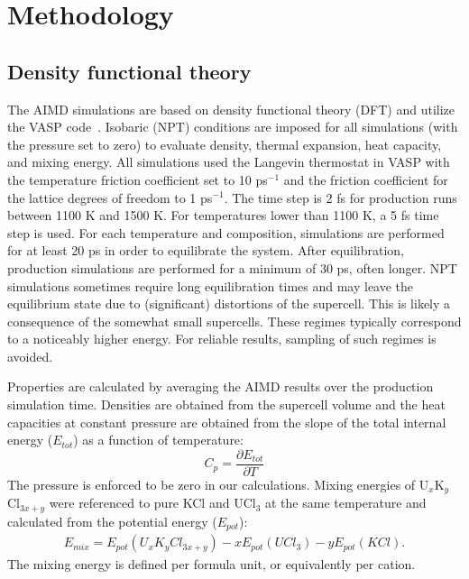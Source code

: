 \documentclass[preprint,3p,10pt,number,sort&compress]{elsarticle}
\begin{document}
\section{Methodology}
\label{sec:method}
\subsection{Density functional theory}
The AIMD simulations are based on density functional theory (DFT) and utilize the VASP code~\cite{Kresse1996}.
Isobaric (NPT) conditions are imposed for all simulations (with the pressure set to zero) to evaluate density, thermal expansion, heat capacity, and mixing energy. All simulations used the Langevin thermostat in VASP with the temperature friction coefficient set to 10 ps$^{-1}$ and the friction coefficient for the lattice degrees of freedom to 1 ps$^{-1}$. The time step is 2 fs for production runs between 1100 K and 1500 K. For temperatures lower than 1100 K, a 5 fs time step is used. For each temperature and composition, simulations are performed for at least 20 ps in order to equilibrate the system. After equilibration, production simulations are performed for a minimum of 30 ps, often longer. NPT simulations sometimes require long equilibration times and may leave the equilibrium state due to (significant) distortions of the supercell. This is likely a consequence of the somewhat small supercells. These regimes typically correspond to a noticeably higher energy. For reliable results, sampling of such regimes is avoided.

Properties are calculated by averaging the AIMD results over the production simulation time. Densities are obtained from the supercell volume and the heat capacities at constant pressure are obtained from the slope of the total internal energy ($E_{tot}$) as a function of temperature:
\begin{equation}
\label{eq:cp}
C_p=\frac{\partial E_{tot}}{\partial T}
\end{equation}
The pressure is enforced to be zero in our calculations. 
Mixing energies of U$_x$K$_y$Cl$_{3x+y}$ were referenced to pure KCl and UCl$_3$ at the same temperature and calculated from the potential energy ($E_{pot}$):
\begin{equation}
\begin{split}
E_{mix}=E_{pot}(U_xK_yCl_{3x+y})-xE_{pot}(UCl_3)-yE_{pot}(KCl).
\end{split}
\end{equation}
The mixing energy is defined per formula unit, or equivalently per cation. 
\end{document}
